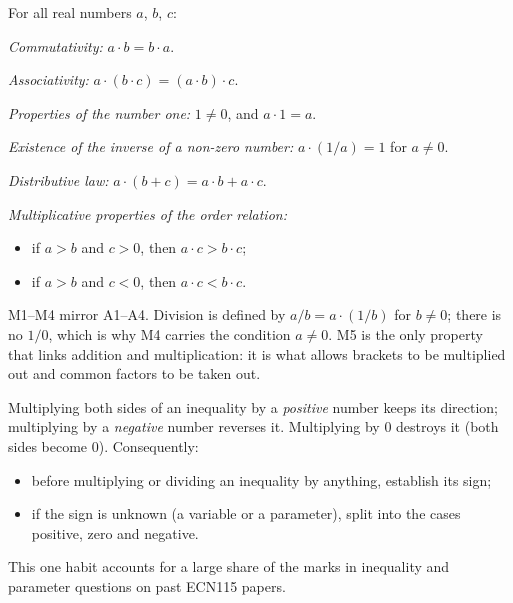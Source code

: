 \begin{definition}
For all real numbers $a$, $b$, $c$:
\begin{description}[style=sameline, leftmargin=3.2em, font=\sffamily\bfseries\color{defcol}]
  \item[M1] \emph{Commutativity:} $a\cdot b=b\cdot a$.
  \item[M2] \emph{Associativity:} $a\cdot(b\cdot c)=(a\cdot b)\cdot c$.
  \item[M3] \emph{Properties of the number one:} $1\ne0$, and $a\cdot1=a$.
  \item[M4] \emph{Existence of the inverse of a non-zero number:} $a\cdot(1/a)=1$ for $a\ne0$.
  \item[M5] \emph{Distributive law:} $a\cdot(b+c)=a\cdot b+a\cdot c$.
  \item[M6] \emph{Multiplicative properties of the order relation:}
  \begin{itemize}
    \item if $a>b$ and $c>0$, then $a\cdot c>b\cdot c$;
    \item if $a>b$ and $c<0$, then $a\cdot c<b\cdot c$.
  \end{itemize}
\end{description}
\end{definition}

M1--M4 mirror A1--A4. Division is defined by $a/b=a\cdot(1/b)$ for $b\ne0$; there is no $1/0$, which is why
M4 carries the condition $a\ne0$. M5 is the only property that links addition and multiplication: it is what
allows brackets to be multiplied out and common factors to be taken out.

\begin{core}
Multiplying both sides of an inequality by a \emph{positive} number keeps its direction; multiplying by a
\emph{negative} number reverses it. Multiplying by $0$ destroys it (both sides become $0$). Consequently:
\begin{itemize}
  \item before multiplying or dividing an inequality by anything, establish its sign;
  \item if the sign is unknown (a variable or a parameter), split into the cases positive, zero and negative.
\end{itemize}
This one habit accounts for a large share of the marks in inequality and parameter questions on past ECN115
papers.
\end{core}

